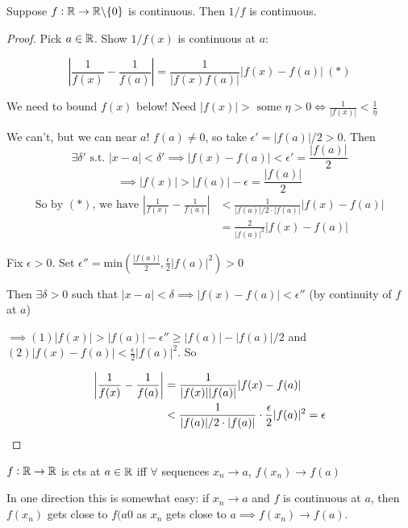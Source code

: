 \documentclass[10pt,twoside]{scrartcl}
\begin{document}
\begin{example}
Suppose $f:\mathbb{R}\to \mathbb{R}\backslash\{0\}$ is continuous. Then $1/f$ is continuous. 

\begin{proof}
Pick $a\in\mathbb{R}$. Show $1/f(x)$ is continuous at $a$: 

\[\left|\frac{1}{f(x)} - \frac{1}{f(a)}\right|  = \frac{1}{|f(x)f(a)|}|f(x)-f(a)| ~(*)\]

We need to bound $f(x)$ below! Need $|f(x)| > \text{ some }\eta > 0 \iff \frac{1}{|f(x)|} < \frac{1}{\eta}$

We can't, but we can near $a$! $f(a) \neq 0$, so take $\epsilon' = |f(a)|/2 >0$. Then 
\[\exists \delta' \text{ s.t. } |x-a| < \delta' \implies|f(x) - f(a)| < \epsilon' = \frac{|f(a)|}{2}\]
\[\implies |f(x)| > |f(a)| -\epsilon = \frac{|f(a)|}{2}\]
\begin{align*}
\text{So by } (*) \text{, we have }\left|\frac{1}{f(x)} - \frac{1}{f(a)}\right| &< \frac{1}{|f(a)|/2\cdot |f(a)|} |f(x) - f(a)| \\ 
	& = \frac{2}{|f(a)|^2}|f(x) - f(a)|
\end{align*}


Fix $\epsilon >0$. Set $\epsilon'' = \mathrm{min}\left(\frac{|f(a)|}{2}, \frac{\epsilon}{2}|f(a)|^2\right) > 0$

Then $\exists \delta > 0$ such that $|x-a| < \delta \implies |f(x) - f(a)| < \epsilon''$ (by continuity of $f$ at $a$)

$\implies (1) |f(x)| > |f(a)| - \epsilon'' \geq |f(a)| - |f(a)|/2$ and $(2) |f(x) - f(a)| < \frac{\epsilon}{2}|f(a)|^2$. So 

\begin{align*}
\left|\frac{1}{f(x)} - \frac{1}{f(a)}\right| &= \frac{1}{|f(x)||f(a)|} |f(x) -f(a)| \\
&< \frac{1}{|f(a)|/2\cdot|f(a)|}\cdot \frac{\epsilon}{2}|f(a)|^2 = \epsilon	\qedhere
\end{align*}

\end{proof}	
\end{example}


\begin{theorem}
	$f: \mathbb{R} \to \mathbb{R}$ is cts at $a \in \mathbb{R}$ iff $\forall$ sequences $x_n \to a$, $f(x_n) \to f(a)$
\end{theorem}

In one direction this is somewhat easy: if $x_n \to a$ and $f$ is continuous at $a$, then $f(x_n)$ gets close to $f(a0$ as $x_n$ gets close to $a \implies f(x_n) \to f(a)$. 
\end{document}
